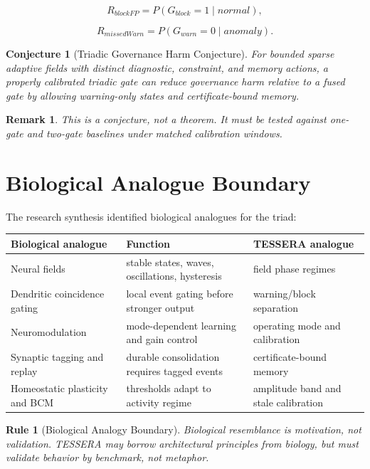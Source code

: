 \documentclass[12pt]{article}
\newtheorem{rulebox}{Rule}
\newtheorem{conjecture}{Conjecture}
\newtheorem{remark}{Remark}
\begin{document}
\[
R_{blockFP}=P(G_{block}=1\mid normal),
\]

\[
R_{missedWarn}=P(G_{warn}=0\mid anomaly).
\]

\begin{conjecture}[Triadic Governance Harm Conjecture]
For bounded sparse adaptive fields with distinct diagnostic, constraint, and
memory actions, a properly calibrated triadic gate can reduce governance harm
relative to a fused gate by allowing warning-only states and certificate-bound
memory.
\end{conjecture}

\begin{remark}
This is a conjecture, not a theorem. It must be tested against one-gate and
two-gate baselines under matched calibration windows.
\end{remark}

\section{Biological Analogue Boundary}

The research synthesis identified biological analogues for the triad:

\begin{longtable}{p{}p{}p{}}
\toprule
\textbf{Biological analogue} & \textbf{Function} & \textbf{TESSERA analogue} \\
\midrule
Neural fields & stable states, waves, oscillations, hysteresis & field phase regimes \\
Dendritic coincidence gating & local event gating before stronger output & warning/block separation \\
Neuromodulation & mode-dependent learning and gain control & operating mode and calibration \\
Synaptic tagging and replay & durable consolidation requires tagged events & certificate-bound memory \\
Homeostatic plasticity and BCM & thresholds adapt to activity regime & amplitude band and stale calibration \\
\bottomrule
\end{longtable}

\begin{rulebox}[Biological Analogy Boundary]
Biological resemblance is motivation, not validation. TESSERA may borrow
architectural principles from biology, but must validate behavior by benchmark,
not metaphor.
\end{rulebox}
\end{document}
